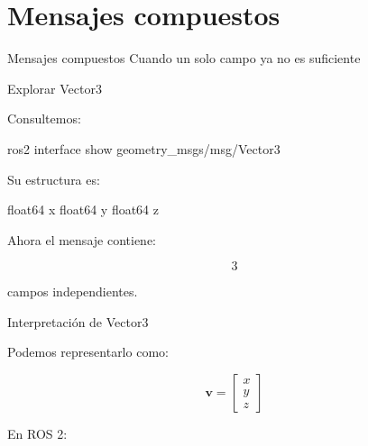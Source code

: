 \documentclass[aspectratio=169]{beamer}
\begin{document}
\section{Mensajes compuestos}

\SectionSlide
{Mensajes compuestos}
{Cuando un solo campo ya no es suficiente}

\begin{frame}[fragile]{Explorar Vector3}

    Consultemos:

    \begin{bashcodedark}
        ros2 interface show geometry_msgs/msg/Vector3
    \end{bashcodedark}

    Su estructura es:

    \begin{consolecodedark}
        float64 x
        float64 y
        float64 z
    \end{consolecodedark}

    \vspace{0.3cm}

    Ahora el mensaje contiene:

    \[
    3
    \]

    campos independientes.

\end{frame}

\begin{frame}{Interpretación de Vector3}

    Podemos representarlo como:

    \[
    \mathbf{v}
    =
    \begin{bmatrix}
        x\\
        y\\
        z
    \end{bmatrix}
    \]

    En ROS 2:

    \begin{center}
    \end{center}

\end{frame}
\end{document}
